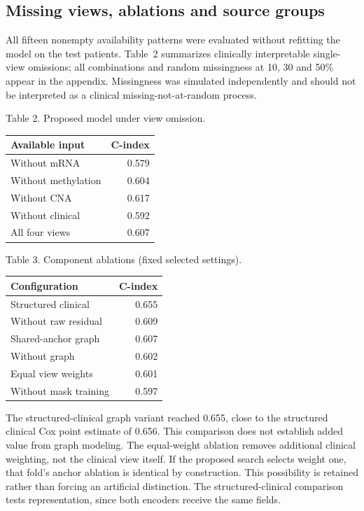 \documentclass{article}
\begin{document}
\subsection{Missing views, ablations and source groups}
All fifteen nonempty availability patterns were evaluated without refitting
the model on the test patients. Table~2 summarizes clinically interpretable
single-view omissions; all combinations and random missingness at 10, 30
and 50\% appear in the appendix. Missingness was simulated independently
and should not be interpreted as a clinical missing-not-at-random process.
\begin{center}\small Table 2. Proposed model under view omission.\end{center}
\begin{center}
\footnotesize
\begin{tabular}{lr}\hline
Available input & C-index\\\hline
Without mRNA & 0.579\\
Without methylation & 0.604\\
Without CNA & 0.617\\
Without clinical & 0.592\\
All four views & 0.607\\
\hline\end{tabular}
\end{center}
\begin{center}\small Table 3. Component ablations (fixed selected settings).\end{center}
\begin{center}
\footnotesize
\begin{tabular}{lr}\hline
Configuration & C-index\\\hline
Structured clinical & 0.655\\
Without raw residual & 0.609\\
Shared-anchor graph & 0.607\\
Without graph & 0.602\\
Equal view weights & 0.601\\
Without mask training & 0.597\\
\hline\end{tabular}
\end{center}
The structured-clinical graph variant reached 0.655, close to the
structured clinical Cox point estimate of 0.656. This comparison does not
establish added value from graph modeling.
The equal-weight ablation removes additional clinical weighting, not the
clinical view itself. If the proposed search selects weight one, that fold's
anchor ablation is identical by construction. This possibility is retained
rather than forcing an artificial distinction. The structured-clinical
comparison tests representation, since both encoders receive the same fields.
\end{document}
